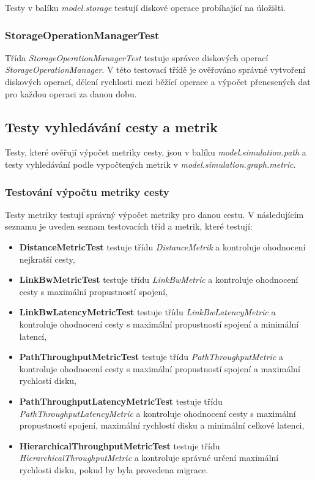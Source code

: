 \documentclass[czech,DP]{thesiskiv}
\begin{document}
Testy v balíku \textit{model.storage} testují diskové operace probíhající na úložišti.

\subsubsection*{StorageOperationManagerTest}

Třída \textit{StorageOperationManagerTest} testuje správce diskových operací \textit{StorageOperationManager}. V této testovací třídě je ověřováno správné vytvoření diskových operací, dělení rychlosti mezi běžící operace a výpočet přenesených dat pro každou operaci za danou dobu.

\subsection{Testy vyhledávání cesty a metrik}

Testy, které ověřují výpočet metriky cesty, jsou v balíku \textit{model.simulation.path} a testy vyhledávání podle vypočtených metrik v \textit{model.simulation.graph.metric}.

\subsubsection*{Testování výpočtu metriky cesty}

Testy metriky testují správný výpočet metriky pro danou cestu. V následujícím seznamu je uveden seznam testovacích tříd a metrik, které testují:

\begin{itemize}
\item \textbf{DistanceMetricTest} testuje třídu \textit{DistanceMetrik} a kontroluje ohodnocení nejkratší cesty,
\item \textbf{LinkBwMetricTest} testuje třídu \textit{LinkBwMetric} a kontroluje ohodnocení cesty s maximální propustností spojení,
\item \textbf{LinkBwLatencyMetricTest} testuje třídu \textit{LinkBwLatencyMetric} a kontroluje ohodnocení cesty s maximální propustností spojení a minimální latencí,
\item \textbf{PathThroughputMetricTest} testuje třídu \textit{PathThroughputMetric} a kontroluje ohodnocení cesty s maximální propustností spojení a maximální rychlostí disku,
\item \textbf{PathThroughputLatencyMetricTest} testuje třídu \textit{PathThroughputLatencyMetric} a kontroluje ohodnocení cesty s maximální propustností spojení, maximální rychlostí disku a minimální celkové latenci,
\item \textbf{HierarchicalThroughputMetricTest} testuje třídu \textit{HierarchicalThroughputMetric} a kontroluje správné určení maximální rychlosti disku, pokud by byla provedena migrace.
\end{itemize}
\end{document}
